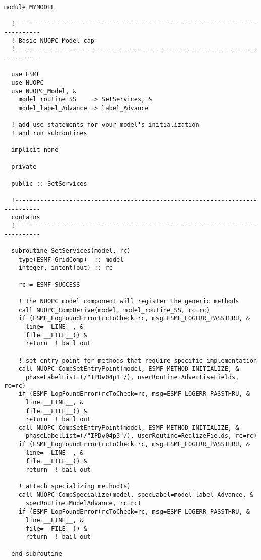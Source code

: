  \begin{verbatim}
module MYMODEL

  !-----------------------------------------------------------------------------
  ! Basic NUOPC Model cap
  !-----------------------------------------------------------------------------

  use ESMF
  use NUOPC
  use NUOPC_Model, &
    model_routine_SS    => SetServices, &
    model_label_Advance => label_Advance
    
  ! add use statements for your model's initialization
  ! and run subroutines
  
  implicit none
  
  private
  
  public :: SetServices
  
  !-----------------------------------------------------------------------------
  contains
  !-----------------------------------------------------------------------------
  
  subroutine SetServices(model, rc)
    type(ESMF_GridComp)  :: model
    integer, intent(out) :: rc
    
    rc = ESMF_SUCCESS
    
    ! the NUOPC model component will register the generic methods
    call NUOPC_CompDerive(model, model_routine_SS, rc=rc)
    if (ESMF_LogFoundError(rcToCheck=rc, msg=ESMF_LOGERR_PASSTHRU, &
      line=__LINE__, &
      file=__FILE__)) &
      return  ! bail out
    
    ! set entry point for methods that require specific implementation
    call NUOPC_CompSetEntryPoint(model, ESMF_METHOD_INITIALIZE, &
      phaseLabelList=(/"IPDv04p1"/), userRoutine=AdvertiseFields, rc=rc)
    if (ESMF_LogFoundError(rcToCheck=rc, msg=ESMF_LOGERR_PASSTHRU, &
      line=__LINE__, &
      file=__FILE__)) &
      return  ! bail out
    call NUOPC_CompSetEntryPoint(model, ESMF_METHOD_INITIALIZE, &
      phaseLabelList=(/"IPDv04p3"/), userRoutine=RealizeFields, rc=rc)
    if (ESMF_LogFoundError(rcToCheck=rc, msg=ESMF_LOGERR_PASSTHRU, &
      line=__LINE__, &
      file=__FILE__)) &
      return  ! bail out
    
    ! attach specializing method(s)
    call NUOPC_CompSpecialize(model, specLabel=model_label_Advance, &
      specRoutine=ModelAdvance, rc=rc)
    if (ESMF_LogFoundError(rcToCheck=rc, msg=ESMF_LOGERR_PASSTHRU, &
      line=__LINE__, &
      file=__FILE__)) &
      return  ! bail out
    
  end subroutine
  

\end{verbatim}
